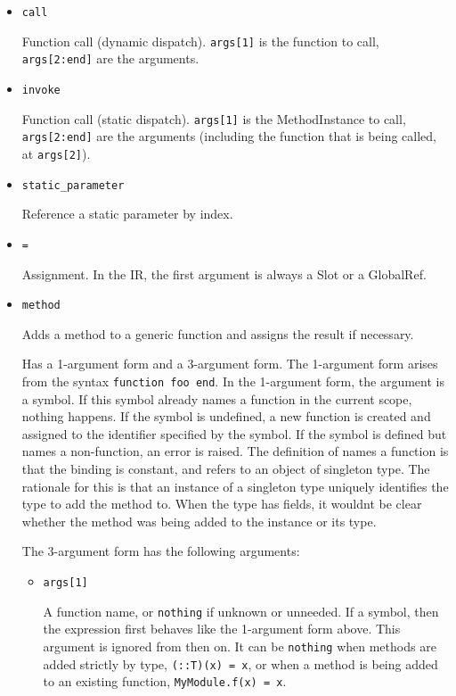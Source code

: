 \begin{itemize}
\item \texttt{call}

Function call (dynamic dispatch). \texttt{args[1]} is the function to call, \texttt{args[2:end]} are the arguments.


\item \texttt{invoke}

Function call (static dispatch). \texttt{args[1]} is the MethodInstance to call, \texttt{args[2:end]} are the arguments (including the function that is being called, at \texttt{args[2]}).


\item \texttt{static\_parameter}

Reference a static parameter by index.


\item \texttt{=}

Assignment. In the IR, the first argument is always a Slot or a GlobalRef.


\item \texttt{method}

Adds a method to a generic function and assigns the result if necessary.

Has a 1-argument form and a 3-argument form. The 1-argument form arises from the syntax \texttt{function foo end}. In the 1-argument form, the argument is a symbol. If this symbol already names a function in the current scope, nothing happens. If the symbol is undefined, a new function is created and assigned to the identifier specified by the symbol. If the symbol is defined but names a non-function, an error is raised. The definition of {\textquotedbl}names a function{\textquotedbl} is that the binding is constant, and refers to an object of singleton type. The rationale for this is that an instance of a singleton type uniquely identifies the type to add the method to. When the type has fields, it wouldn{\textquotesingle}t be clear whether the method was being added to the instance or its type.

The 3-argument form has the following arguments:

\begin{itemize}
\item \texttt{args[1]}

A function name, or \texttt{nothing} if unknown or unneeded. If a symbol, then the expression first behaves like the 1-argument form above. This argument is ignored from then on. It can be \texttt{nothing} when methods are added strictly by type, \texttt{(::T)(x) = x}, or when a method is being added to an existing function, \texttt{MyModule.f(x) = x}.



\end{itemize}
\end{itemize}
